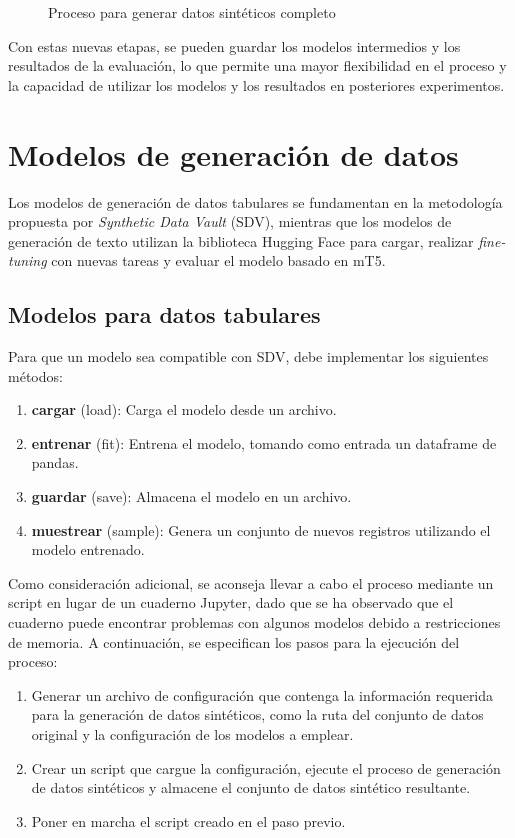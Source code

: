 \begin{figure}[H]
	\centering
	
	\caption{Proceso para generar datos sintéticos completo}
	\label{process-sdv-2}
\end{figure}

Con estas nuevas etapas, se pueden guardar los modelos intermedios y los resultados de la evaluación, lo que permite una mayor flexibilidad en el proceso y la capacidad de utilizar los modelos y los resultados en posteriores experimentos.



\section{Modelos de generación de datos}
\label{subsec:generacion}

Los modelos de generación de datos tabulares se fundamentan en la metodología propuesta por \emph{Synthetic Data Vault} (SDV), mientras que los modelos de generación de texto utilizan la biblioteca Hugging Face para cargar, realizar \emph{fine-tuning} con nuevas tareas y evaluar el modelo basado en mT5.

\subsection{Modelos para datos tabulares}
Para que un modelo sea compatible con SDV, debe implementar los siguientes métodos:
\begin{enumerate}
    \item \textbf{cargar} (load): Carga el modelo desde un archivo.
    \item \textbf{entrenar} (fit): Entrena el modelo, tomando como entrada un dataframe de pandas.
    \item \textbf{guardar} (save): Almacena el modelo en un archivo.
    \item \textbf{muestrear} (sample): Genera un conjunto de nuevos registros utilizando el modelo entrenado.
\end{enumerate}


Como consideración adicional, se aconseja llevar a cabo el proceso mediante un script en lugar de un cuaderno Jupyter, dado que se ha observado que el cuaderno puede encontrar problemas con algunos modelos debido a restricciones de memoria. A continuación, se especifican los pasos para la ejecución del proceso:
\begin{enumerate}
\item Generar un archivo de configuración que contenga la información requerida para la generación de datos sintéticos, como la ruta del conjunto de datos original y la configuración de los modelos a emplear.
\item Crear un script que cargue la configuración, ejecute el proceso de generación de datos sintéticos y almacene el conjunto de datos sintético resultante.
\item Poner en marcha el script creado en el paso previo.
\end{enumerate}


